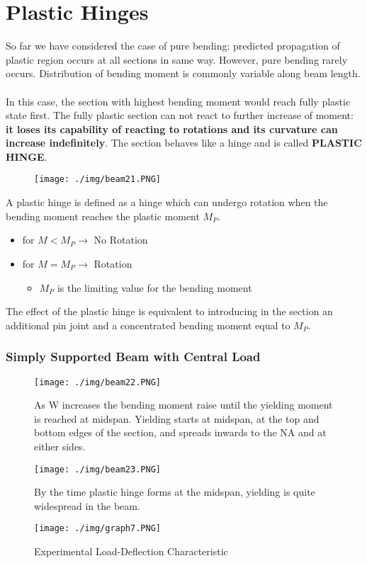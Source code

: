 \section{Plastic Hinges}
So far we have considered the case of pure bending: predicted propagation of plastic region occurs at all sections in same way. However, pure bending rarely occurs. Distribution of bending moment is commonly variable along beam length. \\\\
In this case, the section with highest bending moment would reach fully plastic state first. The fully plastic section can not react to further increase of moment: \textbf{it loses its capability of reacting to rotations and its curvature can increase indefinitely}. The section behaves like a hinge and is called \textbf{PLASTIC HINGE}.
\begin{figure}[H]
  \centering
  \texttt{[image: ./img/beam21.PNG]}
\end{figure}
A plastic hinge is defined as a hinge which can undergo rotation when the bending moment reaches the plastic moment $M_P$.
\begin{itemize}
  \item for $M<M_P \longrightarrow$ No Rotation
  \item for $M=M_P \longrightarrow$ Rotation
        \begin{itemize}
          \item $M_P$ is the limiting value for the bending moment
        \end{itemize}
\end{itemize}
The effect of the plastic hinge is equivalent to introducing in the section an additional pin joint and a concentrated bending moment equal to $M_P$.
\subsubsection{\large Simply Supported Beam with Central Load}
\begin{figure}[H]
  \centering
  \texttt{[image: ./img/beam22.PNG]}
  \caption{As W increases the bending moment raise until the yielding moment is reached at midspan. Yielding starts at midspan, at the top and bottom edges of the section, and spreads inwards to the NA and at either sides.}
\end{figure}
\begin{figure}[H]
  \centering
  \texttt{[image: ./img/beam23.PNG]}
  \caption{By the time plastic hinge forms at the midspan, yielding is quite widespread in the beam.}
\end{figure}
\begin{figure}[H]
  \centering
  \texttt{[image: ./img/graph7.PNG]}
  \caption{Experimental Load-Deflection Characteristic}
\end{figure}
